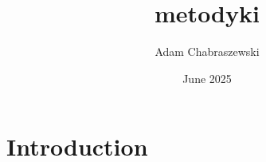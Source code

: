 \documentclass{article}
\title{metodyki}
\author{Adam Chabraszewski}
\date{June 2025}
\begin{document}
\maketitle

\section{Introduction}
\end{document}
